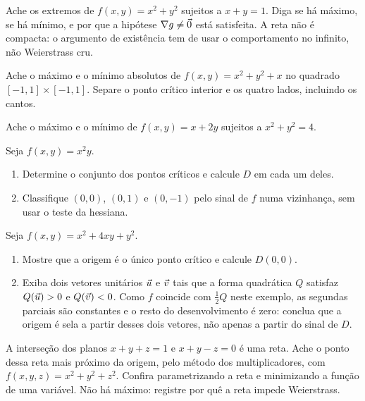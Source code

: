 \documentclass[11pt,a4paper]{article}
\begin{document}
\begin{exercicio}
Ache os extremos de $f(x,y)=x^2+y^2$ sujeitos a $x+y=1$. Diga se há máximo, se há mínimo, e por que a hipótese $\nabla g\neq\vec{0}$ está satisfeita. A reta não é compacta: o argumento de existência tem de usar o comportamento no infinito, não Weierstrass cru.
\end{exercicio}

\begin{exercicio}
Ache o máximo e o mínimo absolutos de $f(x,y)=x^2+y^2+x$ no quadrado $[-1,1]\times[-1,1]$. Separe o ponto crítico interior e os quatro lados, incluindo os cantos.
\end{exercicio}

\begin{exercicio}
Ache o máximo e o mínimo de $f(x,y)=x+2y$ sujeitos a $x^2+y^2=4$.
\end{exercicio}

\begin{exercicio}
Seja $f(x,y)=x^2 y$.
\begin{enumerate}[label=\alph*)]
\item Determine o conjunto dos pontos críticos e calcule $D$ em cada um deles.
\item Classifique $(0,0)$, $(0,1)$ e $(0,-1)$ pelo sinal de $f$ numa vizinhança, sem usar o teste da hessiana.
\end{enumerate}
\end{exercicio}

\begin{exercicio}
Seja $f(x,y)=x^2+4xy+y^2$.
\begin{enumerate}[label=\alph*)]
\item Mostre que a origem é o único ponto crítico e calcule $D(0,0)$.
\item Exiba dois vetores unitários $\vec{u}$ e $\vec{v}$ tais que a forma quadrática $Q$ satisfaz $Q(\vec{u})>0$ e $Q(\vec{v})<0$. Como $f$ coincide com $\frac12 Q$ neste exemplo, as segundas parciais são constantes e o resto do desenvolvimento é zero: conclua que a origem é sela a partir desses dois vetores, não apenas a partir do sinal de $D$.
\end{enumerate}
\end{exercicio}

\begin{exercicio}
A interseção dos planos $x+y+z=1$ e $x+y-z=0$ é uma reta. Ache o ponto dessa reta mais próximo da origem, pelo método dos multiplicadores, com $f(x,y,z)=x^2+y^2+z^2$. Confira parametrizando a reta e minimizando a função de uma variável. Não há máximo: registre por quê a reta impede Weierstrass.
\end{exercicio}
\end{document}

